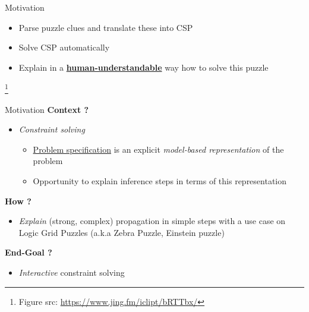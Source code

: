 \documentclass{beamer}
\begin{document}
\begin{frame}{Motivation}
\begin{itemize}
              \begin{itemize}
                  \item Parse puzzle clues and translate these into CSP\pause
                  \item Solve CSP automatically\pause
                  \item Explain in a \textbf{\underline{human-understandable}} way how to solve this puzzle
              \end{itemize}
    \end{itemize}
        \footnote{\tiny Figure src: \url{https://www.jing.fm/iclipt/bRTTbx/}}
\end{frame}

\begin{frame}{Motivation}
    \vfill
    \textbf{Context ?}
    \begin{itemize}
        \item \textit{Constraint solving}
              \begin{itemize}
                  \item \underline{Problem specification} is an explicit \emph{model-based representation} of the problem
                  \item Opportunity to explain inference steps in terms of this representation
              \end{itemize}
    \end{itemize}\pause
    \vfill
    \textbf{How ?}
    \begin{itemize}
        \item \emph{Explain} (strong, complex) propagation in simple steps with a use case on Logic Grid Puzzles (a.k.a Zebra Puzzle, Einstein puzzle)\pause
    \end{itemize}
    \vfill
    \textbf{End-Goal ?}
    \begin{itemize}
        \item \emph{Interactive} constraint solving
    \end{itemize}

    \vfill

\end{frame}
\end{document}
